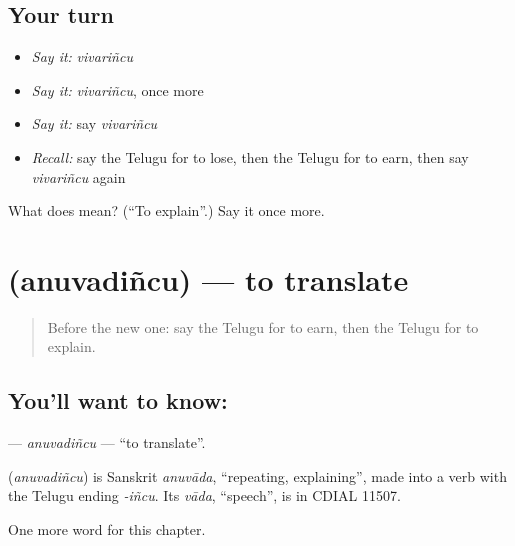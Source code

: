 \subsection*{Your turn}
\begin{itemize}
\raggedright
  \item \emph{Say it:} \emph{vivariñcu}
  \item \emph{Say it:} \emph{vivariñcu}, once more
  \item \emph{Say it:} say \emph{vivariñcu}
  \item \emph{Recall:} say the Telugu for to lose, then the Telugu for to earn, then say \emph{vivariñcu} again
\end{itemize}

\begin{tcolorbox}[breakable,colback=teal!4,colframe=teal!35!black,title={Before you move on}]
What does  mean? (\textquotedblleft{}To explain\textquotedblright{}.) Say it once more.
\end{tcolorbox}
\section[\texorpdfstring{\te{అనువదించు} (anuvadiñcu)}{అనువదించు (anuvadiñcu)}]{ (anuvadiñcu) — to translate}

\label{lesson:TE-C160-anuvadincu}



\begin{quote}
Before the new one: say the Telugu for to earn, then the Telugu for to explain.
\end{quote}

\subsection*{You'll want to know: }
\textbf{} — \emph{anuvadiñcu} — \textquotedblleft{}to translate\textquotedblright{}.

\begin{cousinweb}
\textbf{} (\emph{anuvadiñcu}) is Sanskrit \emph{anuvāda}, \textquotedblleft{}repeating, explaining\textquotedblright{}, made into a verb with the Telugu ending \emph{-iñcu}. Its \emph{vāda}, \textquotedblleft{}speech\textquotedblright{}, is in CDIAL 11507.
\end{cousinweb}

\begin{grammarlens}[title={What you've built}]
One more word for this chapter.
\end{grammarlens}

